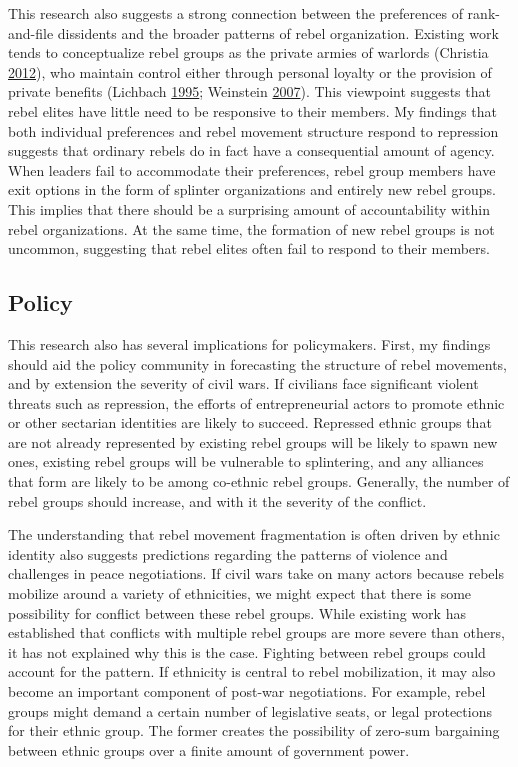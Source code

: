 \documentclass[12pt,]{book}
\theoremstyle{definition}
\theoremstyle{definition}
\theoremstyle{definition}
\theoremstyle{remark}
\begin{document}
This research also suggests a strong connection between the preferences
of rank-and-file dissidents and the broader patterns of rebel
organization. Existing work tends to conceptualize rebel groups as the
private armies of warlords (Christia
\protect\hyperlink{ref-Christia2012}{2012}), who maintain control either
through personal loyalty or the provision of private benefits (Lichbach
\protect\hyperlink{ref-Lichbach1995}{1995}; Weinstein
\protect\hyperlink{ref-Weinstein2007}{2007}). This viewpoint suggests
that rebel elites have little need to be responsive to their members. My
findings that both individual preferences and rebel movement structure
respond to repression suggests that ordinary rebels do in fact have a
consequential amount of agency. When leaders fail to accommodate their
preferences, rebel group members have exit options in the form of
splinter organizations and entirely new rebel groups. This implies that
there should be a surprising amount of accountability within rebel
organizations. At the same time, the formation of new rebel groups is
not uncommon, suggesting that rebel elites often fail to respond to
their members.

\hypertarget{policy}{%
\subsection{Policy}\label{policy}}

This research also has several implications for policymakers. First, my
findings should aid the policy community in forecasting the structure of
rebel movements, and by extension the severity of civil wars. If
civilians face significant violent threats such as repression, the
efforts of entrepreneurial actors to promote ethnic or other sectarian
identities are likely to succeed. Repressed ethnic groups that are not
already represented by existing rebel groups will be likely to spawn new
ones, existing rebel groups will be vulnerable to splintering, and any
alliances that form are likely to be among co-ethnic rebel groups.
Generally, the number of rebel groups should increase, and with it the
severity of the conflict.

The understanding that rebel movement fragmentation is often driven by
ethnic identity also suggests predictions regarding the patterns of
violence and challenges in peace negotiations. If civil wars take on
many actors because rebels mobilize around a variety of ethnicities, we
might expect that there is some possibility for conflict between these
rebel groups. While existing work has established that conflicts with
multiple rebel groups are more severe than others, it has not explained
why this is the case. Fighting between rebel groups could account for
the pattern. If ethnicity is central to rebel mobilization, it may also
become an important component of post-war negotiations. For example,
rebel groups might demand a certain number of legislative seats, or
legal protections for their ethnic group. The former creates the
possibility of zero-sum bargaining between ethnic groups over a finite
amount of government power.
\end{document}
